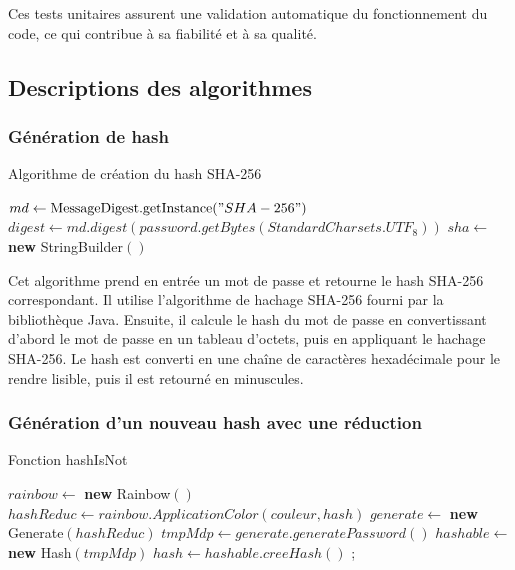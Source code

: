 \documentclass[a4paper,12pt]{article}
\begin{document}
Ces tests unitaires assurent une validation automatique du fonctionnement du code, ce qui contribue à sa fiabilité et à sa qualité.

\subsection{Descriptions des algorithmes}

\subsubsection{Génération de hash}

\begin{algorithm}
    \caption{Algorithme de création du hash SHA-256}
    $md \gets \text{MessageDigest.getInstance}("SHA-256")$\;
    $digest \gets md.digest(password.getBytes(StandardCharsets.UTF_8))$\;
    $sha \gets$ \textbf{new} StringBuilder$()$\;
    \;
\end{algorithm}

Cet algorithme prend en entrée un mot de passe et retourne le hash SHA-256 correspondant. Il utilise l'algorithme de hachage SHA-256 fourni par la bibliothèque Java. Ensuite, il calcule le hash du mot de passe en convertissant d'abord le mot de passe en un tableau d'octets, puis en appliquant le hachage SHA-256. Le hash est converti en une chaîne de caractères hexadécimale pour le rendre lisible, puis il est retourné en minuscules.

\subsubsection{Génération d'un nouveau hash avec une réduction}

\begin{algorithm}
    \caption{Fonction hashIsNot}
    $rainbow \gets$ \textbf{new} Rainbow$()$\;
    $hashReduc \gets rainbow.ApplicationColor(couleur, hash)$\;
    $generate \gets$ \textbf{new} Generate$(hashReduc)$\;
    $tmpMdp \gets generate.generatePassword()$\;
    $hashable \gets$ \textbf{new} Hash$(tmpMdp)$\;
    $hash \gets hashable.creeHash()$\;
    ;
\end{algorithm}
\end{document}
